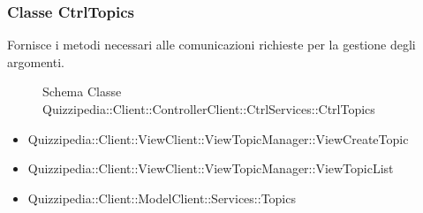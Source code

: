 \subsubsection{Classe CtrlTopics}
Fornisce i metodi necessari alle comunicazioni richieste per la gestione degli argomenti.
\begin{figure}[H]
\centering
\noindent{}
\caption[Schema Classe CtrlTopics]{Schema Classe Quizzipedia::Client::ControllerClient::CtrlServices::CtrlTopics}
\end{figure}
\begin{itemize}
\item Quizzipedia::Client::ViewClient::ViewTopicManager::ViewCreateTopic
\item Quizzipedia::Client::ViewClient::ViewTopicManager::ViewTopicList
\end{itemize}
\begin{itemize}
\item Quizzipedia::Client::ModelClient::Services::Topics
\end{itemize}
